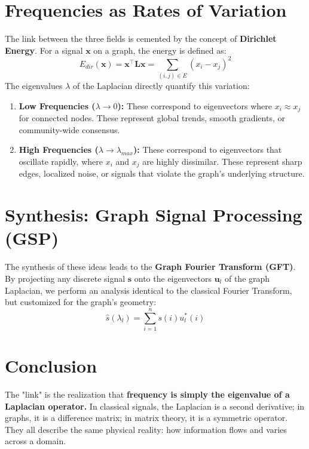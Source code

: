 \begin{notechapter}
\section{Frequencies as Rates of Variation}
The link between the three fields is cemented by the concept of \textbf{Dirichlet Energy}. For a signal $\mathbf{x}$ on a graph, the energy is defined as:
\begin{equation}
    E_{dir}(\mathbf{x}) = \mathbf{x}^\top \mathbf{L} \mathbf{x} = \sum_{(i,j) \in E} (x_i - x_j)^2
\end{equation}
The eigenvalues $\lambda$ of the Laplacian directly quantify this variation:
\begin{enumerate}
    \item \textbf{Low Frequencies ($\lambda \to 0$):} These correspond to eigenvectors where $x_i \approx x_j$ for connected nodes. These represent global trends, smooth gradients, or community-wide consensus.
    \item \textbf{High Frequencies ($\lambda \to \lambda_{max}$):} These correspond to eigenvectors that oscillate rapidly, where $x_i$ and $x_j$ are highly dissimilar. These represent sharp edges, localized noise, or signals that violate the graph's underlying structure.
\end{enumerate}

\section{Synthesis: Graph Signal Processing (GSP)}
The synthesis of these ideas leads to the \textbf{Graph Fourier Transform (GFT)}. By projecting any discrete signal $\mathbf{s}$ onto the eigenvectors $\mathbf{u}_l$ of the graph Laplacian, we perform an analysis identical to the classical Fourier Transform, but customized for the graph's geometry:
\begin{equation}
    \hat{s}(\lambda_l) = \sum_{i=1}^n s(i) u_l^*(i)
\end{equation}

\section{Conclusion}
The "link" is the realization that \textbf{frequency is simply the eigenvalue of a Laplacian operator.} In classical signals, the Laplacian is a second derivative; in graphs, it is a difference matrix; in matrix theory, it is a symmetric operator. They all describe the same physical reality: how information flows and varies across a domain.
\end{notechapter}
